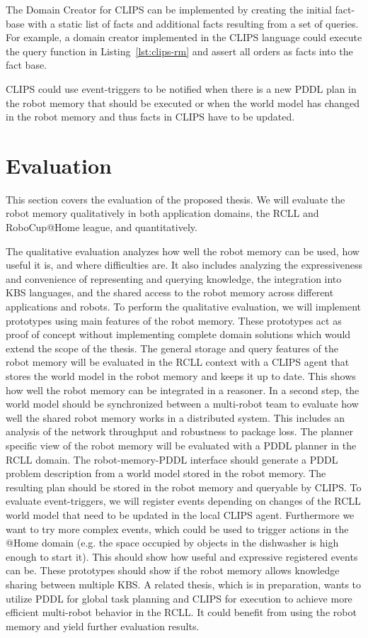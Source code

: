 \documentclass[a4paper,11pt]{article}
\newcommand{\reflst}[1]{Listing~\ref{#1}}
\begin{document}
The Domain Creator for CLIPS can be implemented by creating the initial
fact-base with a static list of facts and additional facts resulting
from a set of queries. For example, a domain creator implemented in
the CLIPS language could execute the query function in
\reflst{lst:clips-rm} and assert all orders as facts into the fact
base.

CLIPS could use event-triggers to be notified when there is a new PDDL
plan in the robot memory that should be executed or when the world
model has changed in the robot memory and thus facts in CLIPS have to
be updated.

\section{Evaluation}
\label{sec:eval}
This section covers the evaluation of the proposed thesis. We will
evaluate the robot memory qualitatively in both application domains,
the RCLL and RoboCup@Home league, and quantitatively.

The qualitative evaluation analyzes how well the robot memory can be
used, how useful it is, and where difficulties are. It also includes
analyzing the expressiveness and convenience of representing and
querying knowledge, the integration into KBS
languages, and the shared access to the robot memory across different
applications and robots. To perform the qualitative evaluation, we
will implement prototypes using main features of the robot
memory. These prototypes act as proof of concept without implementing
complete domain solutions which would extend the scope of the thesis.
%
The general storage and query features of the robot memory will be
evaluated in the RCLL context with a CLIPS agent that stores the world
model in the robot memory and keeps it up to date. This shows how well
the robot memory can be integrated in a reasoner.
%
In a second step, the world model should be synchronized between a
multi-robot team to evaluate how well the shared robot memory works in
a distributed system. This includes an analysis of the network
throughput and robustness to package loss.
%
The planner specific view of the robot memory will be evaluated with a
PDDL planner in the RCLL domain. The robot-memory-PDDL interface
should generate a PDDL problem description from a world model stored
in the robot memory. The resulting plan should be stored in the robot
memory and queryable by CLIPS.
%
To evaluate event-triggers, we will register events depending on
changes of the RCLL world model that need to be updated in the local
CLIPS agent. Furthermore we want to try more complex events, which
could be used to trigger actions in the @Home domain (e.g. the space
occupied by objects in the dishwasher is high enough to start it).
This should show how useful and expressive registered events can be.
% 
These prototypes should show if the robot memory allows knowledge
sharing between multiple KBS. A related thesis,
which is in preparation, wants to utilize PDDL for global task
planning and CLIPS for execution to achieve more efficient multi-robot
behavior in the RCLL. It could benefit from using the robot memory and
yield further evaluation results.
\end{document}

